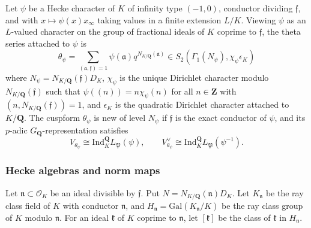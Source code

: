 \documentclass[10pt,letterpaper]{amsart}
\theoremstyle{plain}
\theoremstyle{definition}
\theoremstyle{definition}
\theoremstyle{plain}
\theoremstyle{plain}
\theoremstyle{plain}
\theoremstyle{remark}
\numberwithin{equation}{section}
\newcommand{\fkf}{\mathfrak{f}}
\newcommand{\fkn}{\mathfrak{n}}
\DeclareMathOperator{\p}{\mathfrak{P}}
\def\cO{\mathcal O}
\newcommand{\Q}{\mathbf{Q}}
\newcommand{\Z}{\mathbf{Z}}
\begin{document}
Let $\psi$ be a Hecke character of $K$ of infinity type $(-1,0)$, conductor dividing $\fkf$, and with $x\mapsto\psi(x)x_{\infty}$ taking values in a finite extension $L/K$. Viewing $\psi$ as an $L$-valued character on the group of fractional ideals of $K$ coprime to $\mathfrak{f}$, the theta series attached to $\psi$ is
\begin{equation*}
\theta_{\psi}=\sum_{(\mathfrak{a},\fkf)=1}\psi(\mathfrak{a})q^{N_{K/\Q}(\mathfrak{a})} \in S_2(\Gamma_1(N_\psi),\chi_\psi\epsilon_K)
\end{equation*}
where $N_\psi=N_{K/\Q}(\fkf)D_K$, $\chi_\psi$ is the unique Dirichlet character modulo $N_{K/\Q}(\fkf)$ such that 
$\psi((n))=n\chi_\psi(n)$ for all $n\in\Z$ with $(n,N_{K/\Q}(\fkf))=1$, and $\epsilon_K$ is the quadratic Dirichlet character attached to $K/\Q$. 
The cuspform $\theta_\psi$ is new of level $N_\psi$ if $\fkf$ is the exact conductor of $\psi$, and its $p$-adic $G_\Q$-representation satisfies
\[
V_{\theta_{\psi}}\cong{\mathrm{Ind}}^{\Q}_KL_{\mathfrak{P}}(\psi),
\quad\quad V_{\theta_{\psi}}^{\vee}\cong {\mathrm{Ind}}^{\Q}_KL_{\mathfrak{P}}(\psi^{-1}).
\]
%

\subsubsection{Hecke algebras and norm maps}\label{LLZrecall}

Let $\fkn\subset\cO_K$ be an ideal divisible by $\fkf$. Put $N=N_{K/\Q}(\fkn)D_K$. 
Let $K_\fkn$ be the ray class field of $K$ with conductor $\fkn$, and $H_\fkn={\mathrm{Gal}}(K_\fkn/K)$ be the ray class group of $K$ modulo $\fkn$. For an ideal $\mathfrak{k}$ of $K$ coprime to $\fkn$, let $[\mathfrak{k}]$ be the class of $\mathfrak{k}$ in $H_{\fkn}$.
\end{document}
